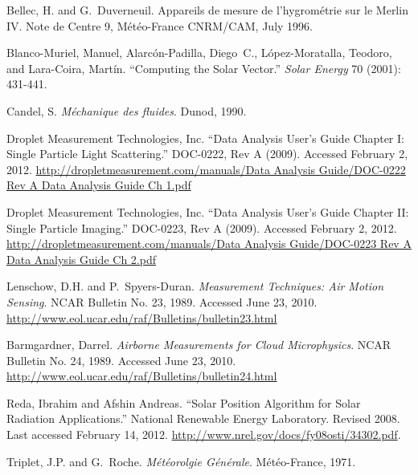 \documentclass[a4paper,11pt]{report}
\begin{document}
\newpage{}
\begin{thebibliography}{5}

 Bellec, H. and G.~Duverneuil. Appareils de mesure de 
l'hygrom\'etrie sur le Merlin IV.  Note de Centre 9, M\'et\'eo-France 
CNRM/CAM, July 1996.

 Blanco-Muriel, Manuel, Alarc\'on-Padilla, Diego~C., L\'opez-Moratalla, Teodoro, 
and Lara-Coira, Mart\'in. ``Computing the Solar Vector.'' \emph{Solar Energy} 70 (2001): 431-441.

 Candel, S. \emph{M\'echanique des fluides}. Dunod, 1990.

 Droplet Measurement Technologies, Inc. ``Data Analysis User's Guide Chapter I:
Single Particle Light Scattering.'' DOC-0222, Rev A (2009). Accessed February 2, 2012. 
\href{http://dropletmeasurement.com/manuals/Data\%20Analysis\%20Guide/DOC-0222\%20Rev\%20A\%20Data\%20Analysis\%20Guide\%20Ch\%201.pdf}{http://dropletmeasurement.com/manuals/Data Analysis Guide/DOC-0222 Rev A Data Analysis Guide Ch 1.pdf}

 Droplet Measurement Technologies, Inc. ``Data Analysis User's Guide Chapter II:
Single Particle Imaging.'' DOC-0223, Rev A (2009). Accessed February 2, 2012. 
\href{http://dropletmeasurement.com/manuals/Data\%20Analysis\%20Guide/DOC-0223\%20Rev\%20A\%20Data\%20Analysis\%20Guide\%20Ch\%202.pdf}{http://dropletmeasurement.com/manuals/Data Analysis Guide/DOC-0223 Rev A Data Analysis Guide Ch 2.pdf}

 Lenschow, D.H. and P.~Spyers-Duran. \emph{Measurement Techniques: Air Motion Sensing}.
NCAR Bulletin No. 23, 1989. Accessed June 23, 2010.
\href{http://www.eol.ucar.edu/raf/Bulletins/bulletin23.html}{http://www.eol.ucar.edu/raf/Bulletins/bulletin23.html}

 Barmgardner, Darrel. \emph{Airborne Measurements for Cloud Microphysics}. 
NCAR Bulletin No. 24, 1989. Accessed June 23, 2010.  \href{http://www.eol.ucar.edu/raf/Bulletins/bulletin24.html}{http://www.eol.ucar.edu/raf/Bulletins/bulletin24.html}

   Reda, Ibrahim and Afshin Andreas. ``Solar Position Algorithm for Solar Radiation Applications.'' National Renewable Energy Laboratory. Revised 2008. Last accessed February 14, 2012. \href{http://www.nrel.gov/docs/fy08osti/34302.pdf}{http://www.nrel.gov/docs/fy08osti/34302.pdf}.

 Triplet, J.P. and G.~Roche. \emph{M\'et\'eorolgie G\'en\'erale}. M\'et\'eo-France, 1971.


\end{thebibliography}
\end{document}
